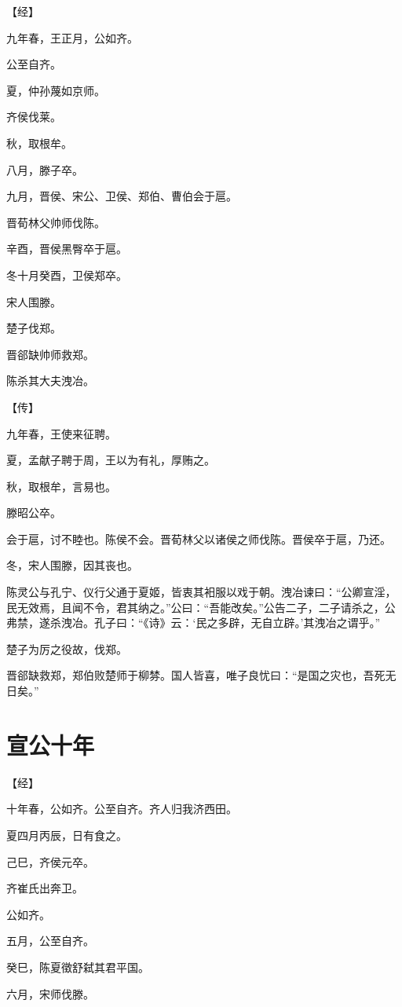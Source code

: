 \documentclass[a4paper,12pt,UTF8,twoside]{ctexbook}
\begin{document}
【经】

九年春，王正月，公如齐。

公至自齐。

夏，仲孙蔑如京师。

齐侯伐莱。

秋，取根牟。

八月，滕子卒。

九月，晋侯、宋公、卫侯、郑伯、曹伯会于扈。

晋荀林父帅师伐陈。

辛酉，晋侯黑臀卒于扈。

冬十月癸酉，卫侯郑卒。

宋人围滕。

楚子伐郑。

晋郤缺帅师救郑。

陈杀其大夫洩冶。

【传】

九年春，王使来征聘。



夏，孟献子聘于周，王以为有礼，厚贿之。

秋，取根牟，言易也。

滕昭公卒。

会于扈，讨不睦也。陈侯不会。晋荀林父以诸侯之师伐陈。晋侯卒于扈，乃还。

冬，宋人围滕，因其丧也。

陈灵公与孔宁、仪行父通于夏姬，皆衷其衵服以戏于朝。洩冶谏曰：“公卿宣淫，民无效焉，且闻不令，君其纳之。”公曰：“吾能改矣。”公告二子，二子请杀之，公弗禁，遂杀洩冶。孔子曰：“《诗》云：‘民之多辟，无自立辟。’其洩冶之谓乎。”

楚子为厉之役故，伐郑。

晋郤缺救郑，郑伯败楚师于柳棼。国人皆喜，唯子良忧曰：“是国之灾也，吾死无日矣。”


\chapter{宣公十年}



【经】

十年春，公如齐。公至自齐。齐人归我济西田。

夏四月丙辰，日有食之。

己巳，齐侯元卒。

齐崔氏出奔卫。

公如齐。

五月，公至自齐。

癸巳，陈夏徵舒弑其君平国。

六月，宋师伐滕。
\end{document}
